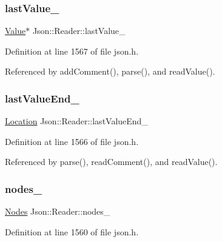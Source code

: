 \subsubsection{\texorpdfstring{last\+Value\+\_\+}{lastValue\_}}
{\footnotesize\ttfamily \hyperlink{class_json_1_1_value}{Value}$\ast$ Json\+::\+Reader\+::last\+Value\+\_\+\hspace{0.3cm}{\ttfamily [private]}}



Definition at line 1567 of file json.\+h.



Referenced by add\+Comment(), parse(), and read\+Value().

\mbox{\label{class_json_1_1_reader_a497a114f7b760f1b794b8fff9876615a}} 
\subsubsection{\texorpdfstring{last\+Value\+End\+\_\+}{lastValueEnd\_}}
{\footnotesize\ttfamily \hyperlink{class_json_1_1_reader_a46795b5b272bf79a7730e406cb96375a}{Location} Json\+::\+Reader\+::last\+Value\+End\+\_\+\hspace{0.3cm}{\ttfamily [private]}}



Definition at line 1566 of file json.\+h.



Referenced by parse(), read\+Comment(), and read\+Value().

\mbox{\label{class_json_1_1_reader_ada3d2c47699dad662e6d156c8c78a6ac}} 
\subsubsection{\texorpdfstring{nodes\+\_\+}{nodes\_}}
{\footnotesize\ttfamily \hyperlink{class_json_1_1_reader_a8da2114fe8b8124d41ea2f3434f0171b}{Nodes} Json\+::\+Reader\+::nodes\+\_\+\hspace{0.3cm}{\ttfamily [private]}}



Definition at line 1560 of file json.\+h.



